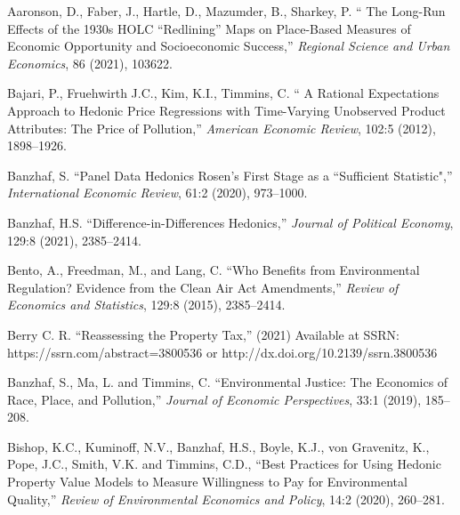 \documentclass[ecta,nameyear,draft]{econsocart}
\theoremstyle{plain}
\theoremstyle{remark}
\begin{document}
\begin{thebibliography}{}

\textup{Aaronson, D., Faber, J., Hartle, D., Mazumder, B., Sharkey, P.} %
`` The Long-Run Effects of the 1930s HOLC “Redlining” Maps on Place-Based
Measures of Economic Opportunity and Socioeconomic Success,''
\textit{Regional Science and Urban Economics}, 86 (2021), 103622.
\endbibitem

\textup{Bajari, P., Fruehwirth J.C., Kim, K.I., Timmins, C.} %
`` A Rational Expectations Approach to Hedonic Price Regressions with Time-Varying Unobserved Product Attributes: The Price of Pollution,''
\textit{American Economic Review}, 102:5 (2012), 1898--1926.
\endbibitem

\textup{Banzhaf, S.} %
``Panel Data Hedonics Rosen’s First Stage as a “Sufficient
Statistic",''
\textit{International Economic Review}, 61:2 (2020), 973--1000.
\endbibitem

\textup{Banzhaf, H.S.} %
``Difference-in-Differences Hedonics,''
\textit{Journal of Political Economy}, 129:8 (2021), 2385--2414.
\endbibitem


\textup{Bento, A., Freedman, M., and Lang, C.} %
``Who Benefits from Environmental Regulation? Evidence from the Clean Air Act Amendments,''
\textit{Review of Economics and Statistics}, 129:8 (2015), 2385--2414.
\endbibitem

\textup{Berry C. R.} %
``Reassessing the Property Tax,'' (2021)
Available at SSRN: https://ssrn.com/abstract=3800536 or http://dx.doi.org/10.2139/ssrn.3800536
\endbibitem

\textup{Banzhaf, S., Ma, L. and Timmins, C.} %
``Environmental Justice: The Economics of Race, Place, and Pollution,''
\textit{Journal of Economic Perspectives}, 33:1 (2019), 185--208.
\endbibitem

\textup{Bishop, K.C., Kuminoff, N.V., Banzhaf, H.S., Boyle, K.J., von Gravenitz, K., Pope, J.C., Smith, V.K. and Timmins, C.D., } %
``Best Practices for Using Hedonic Property Value Models to Measure Willingness to Pay for Environmental Quality,''
\textit{Review of Environmental Economics and Policy}, 14:2 (2020), 260--281.
\endbibitem


\end{thebibliography}
\end{document}
